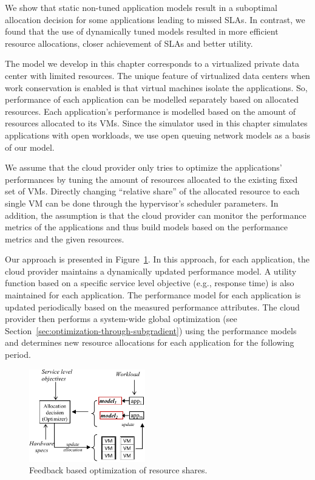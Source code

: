 We show that static non-tuned application models result in a suboptimal allocation decision for some applications leading to missed SLAs. In contrast, we found that the use of dynamically tuned models resulted in more efficient resource allocations, closer achievement of SLAs and better utility. 

The model we develop in this chapter corresponds to a virtualized private data center with limited resources. The unique feature of virtualized data centers when work conservation is enabled is that virtual machines isolate the applications. So, performance of each application can be modelled separately based on allocated resources.
Each application's performance is modelled based on the amount of resources allocated to its VMs. Since the simulator used in this chapter simulates applications with open workloads, we use open queuing network models as a basis of our model.

We assume that the cloud provider only tries to optimize the applications' performances by tuning the amount of resources allocated to the existing fixed set of VMs.  Directly changing ``relative share'' of the allocated resource to each single VM can be done through the hypervisor's scheduler parameters. In addition, the assumption is that the cloud provider can monitor the performance metrics of the applications and thus build models based on the performance metrics and the given resources.
 
Our approach is presented in Figure~\ref{fig:feedback-based-optimization}. 
In this approach, for each application, the cloud provider maintains a dynamically updated performance model. 
A utility function based on a specific service level objective (e.g., response time) is also maintained for each application.    
The performance model for each application is updated periodically based on the measured performance attributes.  The cloud provider then performs a system-wide global optimization (see Section~\ref{sec:optimization-through-subgradient}) using the performance models and determines new resource allocations for each application for the following period. 
\begin{figure}[h]
	\centering
		\includegraphics[width=0.45\textwidth]{image/centralized1/image2new}
	\caption[Architecture of the proposed feedback-based optimization approach for private cloud.]{Feedback based optimization of resource shares.} 
	\label{fig:feedback-based-optimization}
\end{figure}

